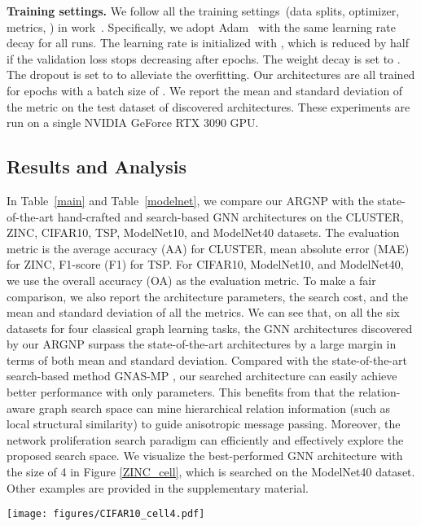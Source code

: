 \noindent
\textbf{Training settings. }
We follow all the training settings~(data splits, optimizer, metrics, \etc) in work~\cite{Cai2021RethinkingGN,bench}. 
Specifically, we adopt Adam~\cite{ADAM} with the same learning rate decay for all runs. 
The learning rate is initialized with , which is reduced by half if the validation loss stops decreasing after  epochs. 
The weight decay is set to . 
The dropout is set to  to alleviate the overfitting. 
Our architectures are all trained for  epochs with a batch size of . 
We report the mean and standard deviation of the metric on the test dataset of  discovered architectures. 
These experiments are run on a single NVIDIA GeForce RTX 3090 GPU. 


\subsection{Results and Analysis}

In Table~\ref{main} and Table~\ref{modelnet}, we compare our ARGNP with the state-of-the-art hand-crafted and search-based GNN architectures on the CLUSTER, ZINC, CIFAR10, TSP, ModelNet10, and ModelNet40 datasets. 
The evaluation metric is the average accuracy (AA) for CLUSTER, mean absolute error (MAE) for ZINC, F1-score (F1) for TSP. 
For CIFAR10, ModelNet10, and ModelNet40, we use the overall accuracy (OA) as the evaluation metric. 
To make a fair comparison, we also report the architecture parameters, the search cost, and the mean and standard deviation of all the metrics. 
We can see that, on all the six datasets for four classical graph learning tasks, the GNN architectures discovered by our ARGNP surpass the state-of-the-art architectures by a large margin in terms of both mean and standard deviation. 
Compared with the state-of-the-art search-based method GNAS-MP \cite{Cai2021RethinkingGN}, our searched architecture can easily achieve better performance with only  parameters. 
This benefits from that the relation-aware graph search space can mine hierarchical relation information (such as local structural similarity) to guide anisotropic message passing. 
Moreover, the network proliferation search paradigm can efficiently and effectively explore the proposed search space. 
We visualize the best-performed GNN architecture with the size of 4 in Figure \ref{ZINC_cell}, which is searched on the ModelNet40 dataset. 
Other examples are provided in the supplementary material. 


\begin{figure*}[t]

    \centering
    \texttt{[image: figures/CIFAR10\_cell4.pdf]}
    \vspace{-0.5em}
    \caption{
        \textbf{The best GNN architecture with the network size of 4 searched on the ModelNet40 dataset. }
    }
    \vspace{-1em}
    \label{ZINC_cell}

\end{figure*}


